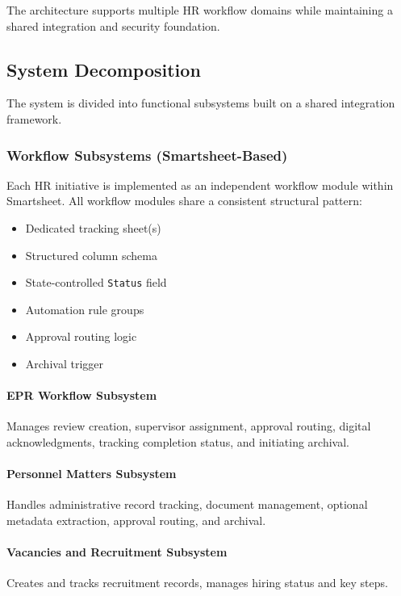 \documentclass[12pt]{article}
\begin{document}
The architecture supports multiple HR workflow domains while maintaining a shared integration and security foundation.

\subsection{System Decomposition}

The system is divided into functional subsystems built on a shared integration framework.

\subsubsection{Workflow Subsystems (Smartsheet-Based)}

Each HR initiative is implemented as an independent workflow module within Smartsheet. All workflow modules share a consistent structural pattern:

\begin{itemize}
    \item Dedicated tracking sheet(s)
    \item Structured column schema
    \item State-controlled \texttt{Status} field
    \item Automation rule groups
    \item Approval routing logic
    \item Archival trigger
\end{itemize}

\paragraph{EPR Workflow Subsystem}
Manages review creation, supervisor assignment, approval routing, digital acknowledgments, tracking completion status, and initiating archival.

\paragraph{Personnel Matters Subsystem}
Handles administrative record tracking, document management, optional metadata extraction, approval routing, and archival.

\paragraph{Vacancies and Recruitment Subsystem}
Creates and tracks recruitment records, manages hiring status and key steps.
\end{document}
